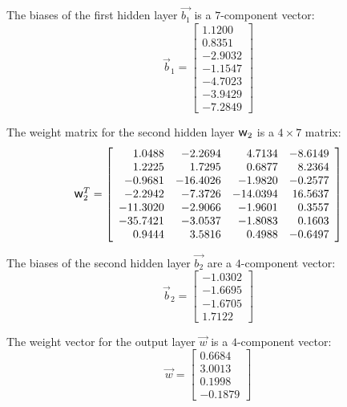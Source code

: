 \documentclass[algorithms,article,accept,pdftex,moreauthors]{Definitions/mdpi}
\DeclareRobustCommand{\w}{\mbox{\large\ensuremath{\mathsf{w}}}}
\begin{document}
The biases of the first hidden layer $\overrightarrow{b_1}$ is a $7$-component vector:
\begin{equation*}
\overrightarrow{b}_1 = \left[
\begin{array}{r}
	1.1200  \\
	0.8351  \\
	-2.9032 \\
	-1.1547 \\
	-4.7023 \\
	-3.9429 \\
	-7.2849
\end{array}\right]
\end{equation*}

The weight matrix for the second hidden layer $\w_2$ is a $4\times7$ matrix:
\begin{equation*}
\w_2^T = \left[
\begin{array}{rrrr}
	1.0488   & -2.2694  & 4.7134   & -8.6149 \\
	1.2225   & 1.7295   & 0.6877   & 8.2364  \\
	-0.9681  & -16.4026 & -1.9820  & -0.2577 \\
	-2.2942  & -7.3726  & -14.0394 & 16.5637 \\
	-11.3020 & -2.9066  & -1.9601  & 0.3557  \\
	-35.7421 & -3.0537  & -1.8083  & 0.1603  \\
	0.9444   & 3.5816   & 0.4988   & -0.6497
\end{array}\right]
\end{equation*}

The biases of the second hidden layer $\overrightarrow{b_2}$ are a $4$-component vector:
\begin{equation*}
\overrightarrow{b}_2 = \left[
\begin{array}{r}
	-1.0302 \\
	-1.6695 \\
	-1.6705 \\
	1.7122
\end{array}\right]
\end{equation*}

The weight vector for the output layer $\overrightarrow{w}$ is a $4$-component vector:
\begin{equation*}
\overrightarrow{w} = \left[
\begin{array}{r}
	0.6684  \\
	3.0013  \\
	0.1998  \\
	-0.1879
\end{array}\right]
\end{equation*}
\end{document}
